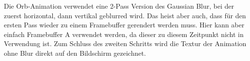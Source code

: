 Die Orb-Animation verwendet eine 2-Pass Version des Gaussian Blur, bei der zuerst horizontal, dann vertikal geblurred
wird.
Das heist aber auch, dass für den ersten Pass wieder zu einem Framebuffer gerendert werden muss.
Hier kann aber einfach Framebuffer A verwendet werden, da dieser zu diesem Zeitpunkt nicht in Verwendung ist.
Zum Schluss des zweiten Schritts wird die Textur der Animation ohne Blur direkt auf den Bildschirm gezeichnet.

\renewcommand{\kapitelautor}{}
